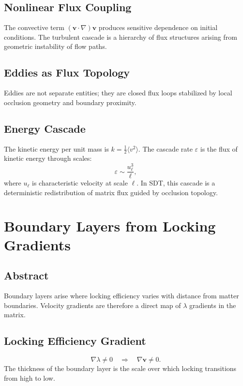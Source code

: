 \documentclass[12pt]{book}
\begin{document}
\section{Nonlinear Flux Coupling}
The convective term $(\mathbf{v}\cdot\nabla)\mathbf{v}$ produces sensitive dependence on initial conditions.
The turbulent cascade is a hierarchy of flux structures arising from geometric instability of flow paths.

\section{Eddies as Flux Topology}
Eddies are not separate entities; they are closed flux loops stabilized by local occlusion geometry and
boundary proximity.

\section{Energy Cascade}
The kinetic energy per unit mass is $k = \frac{1}{2}\langle v^2\rangle$. The cascade rate $\varepsilon$ is
the flux of kinetic energy through scales:
\begin{equation}
\varepsilon \sim \frac{u_\ell^3}{\ell},
\end{equation}
where $u_\ell$ is characteristic velocity at scale $\ell$. In SDT, this cascade is a deterministic
redistribution of matrix flux guided by occlusion topology.

\chapter{Boundary Layers from Locking Gradients}

\section*{Abstract}
Boundary layers arise where locking efficiency varies with distance from matter boundaries. Velocity
gradients are therefore a direct map of $\lambda$ gradients in the matrix.

\section{Locking Efficiency Gradient}
\begin{equation}
\nabla \lambda \neq 0 \quad \Rightarrow \quad \nabla \mathbf{v} \neq 0.
\end{equation}
The thickness of the boundary layer is the scale over which locking transitions from high to low.
\end{document}
